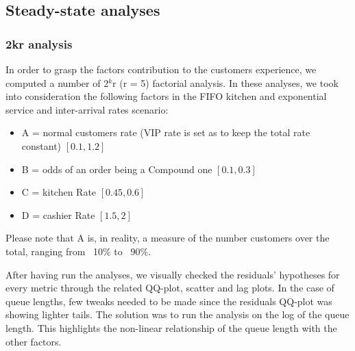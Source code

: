 \subsection{Steady-state analyses}

\subsubsection{2kr analysis}\label{sec:2kr}
In order to grasp the factors contribution to the customers experience, we computed a number of 2$^k$r (r = 5) factorial analysis. In these analyses, we took into 
consideration the following factors in the FIFO kitchen and exponential service and inter-arrival rates scenario: 
\begin{itemize}
  \item A = normal customers rate (VIP rate is set as to keep the total rate constant) $[0.1, 1.2]$
  \item B = odds of an order being a Compound one $[0.1, 0.3]$
  \item C = kitchen Rate $[0.45, 0.6]$
  \item D = cashier Rate $[1.5, 2]$
\end{itemize}
Please note that A is, in reality, a measure of the number customers 
over the total, ranging from ~10\% to ~90\%.

After having run the analyses, we visually checked the residuals' hypotheses for every metric through the related QQ-plot, scatter and lag plots. In the case of queue lengths, few tweaks needed to be made since the residuals QQ-plot was showing lighter tails. The solution was to run the analysis on the log of the queue length. This highlights the non-linear relationship of the queue length with the other factors.


